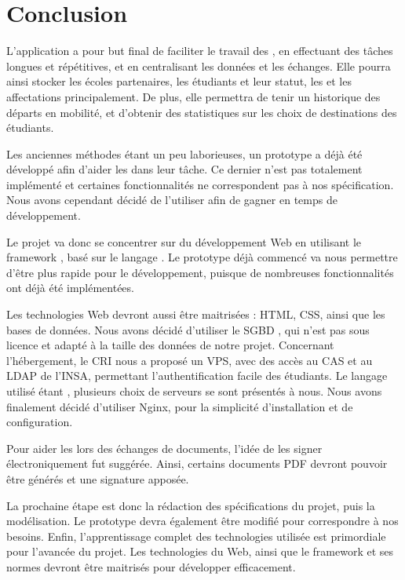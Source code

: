 
	\chapter*{Conclusion}

L'application a pour but final de faciliter le travail des \ris, en effectuant des tâches longues et répétitives, et en centralisant les données et les échanges. Elle pourra ainsi stocker les écoles partenaires, les étudiants et leur statut, les \voe et les affectations principalement. De plus, elle permettra de tenir un historique des départs en mobilité, et d'obtenir des statistiques sur les choix de destinations des étudiants. 

\medbreak

Les anciennes méthodes étant un peu laborieuses, un prototype a déjà été développé afin d'aider les \ris dans leur tâche. Ce dernier n'est pas totalement implémenté et certaines fonctionnalités ne correspondent pas à nos spécification. Nous avons cependant décidé de l'utiliser afin de gagner en temps de développement.

Le projet va donc se concentrer sur du développement Web en utilisant le framework \symfony, basé sur le langage \php.
Le prototype déjà commencé va nous permettre d'être plus rapide pour le développement, puisque de nombreuses fonctionnalités ont déjà été implémentées. 

Les technologies Web devront aussi être maitrisées : HTML, CSS, ainsi que les bases de données. Nous avons décidé d'utiliser le SGBD \mdb, qui n'est pas sous licence et adapté à la taille des données de notre projet. Concernant l'hébergement, le CRI nous a proposé un VPS, avec des accès au CAS et au LDAP de l'INSA, permettant l'authentification facile des étudiants. Le langage utilisé étant \php, plusieurs choix de serveurs se sont présentés à nous. Nous avons finalement décidé d'utiliser Nginx, pour la simplicité d'installation et de configuration.

Pour aider les \ris lors des échanges de documents, l'idée de les signer électroniquement fut suggérée. Ainsi, certains documents PDF devront pouvoir être générés et une signature apposée. 

\medbreak

La prochaine étape est donc la rédaction des spécifications du projet, puis la modélisation. Le prototype devra également être modifié pour correspondre à nos besoins. Enfin, l'apprentissage complet des technologies utilisée est primordiale pour l'avancée du projet. Les technologies du Web, ainsi que le framework \symfony et ses normes devront être maitrisés pour développer efficacement.